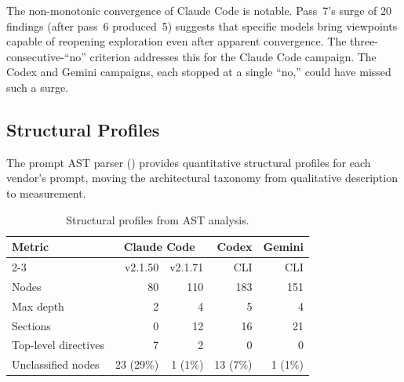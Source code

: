 \documentclass[11pt,a4paper]{article}
\begin{document}
The non-monotonic convergence of Claude Code is notable. Pass~7's
surge of 20 findings (after pass~6 produced~5) suggests that specific
models bring viewpoints capable of reopening exploration even after
apparent convergence. The three-consecutive-``no'' criterion addresses
this for the Claude Code campaign. The Codex and Gemini campaigns, each
stopped at a single ``no,'' could have missed such a surge.


\subsection{Structural Profiles}
\label{sec:structural-profiles}

The prompt AST parser () provides quantitative structural
profiles for each vendor's prompt, moving the architectural taxonomy
from qualitative description to measurement.

\begin{table}[H]
\centering
\caption{Structural profiles from AST analysis.}
\label{tab:structural-profiles}
\begin{tabular}{@{}lrrrr@{}}
\toprule
Metric & \multicolumn{2}{c}{Claude Code} & Codex & Gemini \\
\cmidrule(lr){2-3}
 & v2.1.50 & v2.1.71 & CLI & CLI \\
\midrule
Nodes & 80 & 110 & 183 & 151 \\
Max depth & 2 & 4 & 5 & 4 \\
Sections & 0 & 12 & 16 & 21 \\
Top-level directives & 7 & 2 & 0 & 0 \\
Unclassified nodes & 23 (29\%) & 1 (1\%) & 13 (7\%) & 1 (1\%) \\
\bottomrule
\end{tabular}
\end{table}
\end{document}

